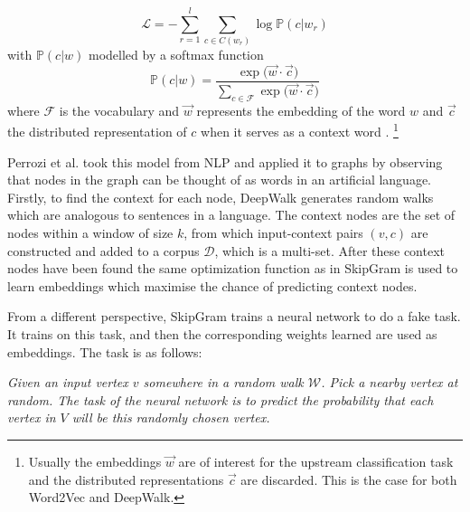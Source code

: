 \documentclass[a4paper]{article}
\renewcommand{\P}{\mathbb P}
\newcommand{\D}{\mathcal D}
\begin{document}
\begin{equation}
  \mathcal{L} = - \sum_{r = 1}^{l} \sum_{c \in C(w_r)} \log{\P(c | w_r)}
\end{equation}
with $\P(c | w)$ modelled by a softmax function
\begin{equation}
  \P(c|w) = \frac{\exp{(\vec{w} \cdot \vec{c}})}{\sum_{c \in \mathcal{F}}\exp{(\vec{w} \cdot
    \vec{c}})}
\end{equation}
where $\mathcal{F}$ is the vocabulary and $\vec{w}$ represents the
embedding of the word $w$ and $\vec{c}$ the distributed representation of $c$ when it serves as a
context word \cite{mikolov2013efficient, mikolov2013distributed}.
\footnote{Usually the embeddings $\vec{w}$ are of interest for the upstream classification task and the distributed representations $\vec{c}$ are discarded. This is the case for both Word2Vec and DeepWalk.}

Perrozi et al. took this model from NLP and applied it to graphs by observing
that nodes in the graph can be thought of as words in an artificial language.
Firstly, to find the context for each node, DeepWalk generates random walks
which are analogous to sentences in a language. The context nodes are the set of
nodes within a window of size $k$, from which input-context pairs $(v, c)$ are
constructed and added to a corpus $\D$, which is a multi-set. After these context nodes have been
found the same optimization function as in SkipGram is used to learn embeddings which maximise
the chance of predicting context nodes.

From a different perspective, SkipGram trains a neural network to do
a fake task. It trains on this task, and then the corresponding weights
learned are used as embeddings. The task is as follows:

\textit{Given an input vertex $v$ somewhere in a random walk $\mathcal{W}$. Pick a
nearby vertex at random. The task of the neural network is to
predict the probability that each vertex in $V$ will be this randomly chosen
vertex.}
\end{document}

